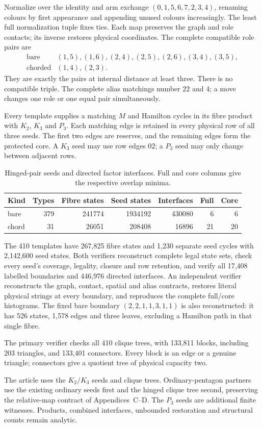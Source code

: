 \documentclass[11pt]{article}
\numberwithin{equation}{section}
\numberwithin{table}{section}
\begin{document}
Normalize over the identity and arm exchange $(0,1,5,6,7,2,3,4)$,
renaming colours by first appearance and appending unused colours
increasingly. The least full normalization tuple fixes ties. Each map
preserves the graph and role contacts; its inverse restores physical
coordinates. The complete compatible role pairs are
\[
\begin{array}{cl}
\text{bare}&(1,5),(1,6),(2,4),(2,5),(2,6),(3,4),(3,5),\\
\text{chorded}&(1,4),(2,3).
\end{array}
\]
They are exactly the pairs at internal distance at least three. There
is no compatible triple. The complete alias matchings number $22$ and
$4$; a move changes one role or one equal pair simultaneously.

Every template supplies a matching $M$ and Hamilton cycles in its fibre
product with $K_2$, $K_3$ and $P_3$. Each matching edge is retained in
every physical row of all three seeds. The first two edges are reserves,
and the remaining edges form the protected core. A $K_3$ seed may use
row edges $02$; a $P_3$ seed may only change between adjacent rows.

\begin{table}[htbp]
\centering\small
\caption{Hinged-pair seeds and directed factor interfaces.
Full and core columns give the respective overlap minima.}
\label{tab:hinged-pair-counts}
\begin{tabular}{lrrrrrr}
\toprule
Kind & Types & Fibre states & Seed states & Interfaces & Full & Core\\
\midrule
bare&379&241774&1934192&430080&6&6\\
chord&31&26051&208408&16896&21&20\\
\bottomrule
\end{tabular}
\end{table}

The 410 templates have 267,825 fibre states and 1,230 separate seed
cycles with 2,142,600 seed states. Both verifiers reconstruct complete
legal state sets, check every seed's coverage, legality, closure and
row retention, and verify all 17,408 labelled boundaries and 446,976
directed interfaces. An independent verifier reconstructs the graph,
contact, spatial and alias contracts, restores literal physical strings at
every boundary, and reproduces the complete full/core histograms.
The fixed bare boundary $(2,2,1,1,3,1,1)$ is also reconstructed: it has
526 states, 1,578 edges and three leaves, excluding a Hamilton path
in that single fibre.

The primary verifier checks all 410 clique trees, with 133,811 blocks,
including 203 triangles, and 133,401 connectors. Every block is an edge
or a genuine triangle; connectors give a quotient tree of physical
capacity two.

The article uses the $K_2/K_3$ seeds and clique trees. Ordinary-pentagon
partners use the existing ordinary seeds first and the hinged clique
tree second, preserving the relative-map contract of Appendices~C--D.
The $P_3$ seeds are additional finite witnesses. Products, combined
interfaces, unbounded restoration and structural counts remain analytic.
\end{document}
